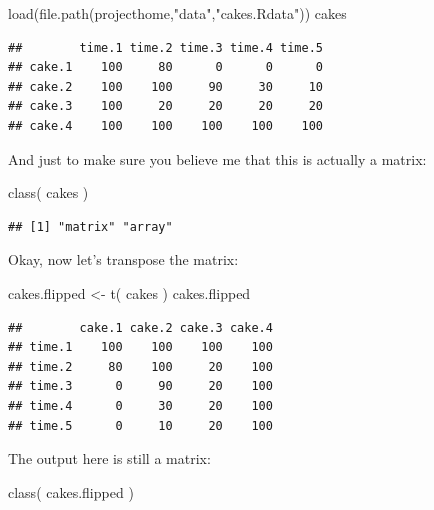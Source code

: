 \documentclass[
]{book}
\newenvironment{Shaded}{\begin{snugshade}}{\end{snugshade}}
\newcommand{\FunctionTok}[1]{\textcolor[rgb]{0.00,0.00,0.00}{#1}}
\newcommand{\NormalTok}[1]{#1}
\newcommand{\OtherTok}[1]{\textcolor[rgb]{0.56,0.35,0.01}{#1}}
\newcommand{\StringTok}[1]{\textcolor[rgb]{0.31,0.60,0.02}{#1}}
\begin{document}
\begin{Shaded}
\begin{Highlighting}[]
\FunctionTok{load}\NormalTok{(}\FunctionTok{file.path}\NormalTok{(projecthome,}\StringTok{"data"}\NormalTok{,}\StringTok{"cakes.Rdata"}\NormalTok{))}
\NormalTok{cakes}
\end{Highlighting}
\end{Shaded}

\begin{verbatim}
##        time.1 time.2 time.3 time.4 time.5
## cake.1    100     80      0      0      0
## cake.2    100    100     90     30     10
## cake.3    100     20     20     20     20
## cake.4    100    100    100    100    100
\end{verbatim}

And just to make sure you believe me that this is actually a matrix:

\begin{Shaded}
\begin{Highlighting}[]
\FunctionTok{class}\NormalTok{( cakes )}
\end{Highlighting}
\end{Shaded}

\begin{verbatim}
## [1] "matrix" "array"
\end{verbatim}

Okay, now let's transpose the matrix:

\begin{Shaded}
\begin{Highlighting}[]
\NormalTok{cakes.flipped }\OtherTok{\textless{}{-}} \FunctionTok{t}\NormalTok{( cakes )}
\NormalTok{cakes.flipped}
\end{Highlighting}
\end{Shaded}

\begin{verbatim}
##        cake.1 cake.2 cake.3 cake.4
## time.1    100    100    100    100
## time.2     80    100     20    100
## time.3      0     90     20    100
## time.4      0     30     20    100
## time.5      0     10     20    100
\end{verbatim}

The output here is still a matrix:

\begin{Shaded}
\begin{Highlighting}[]
\FunctionTok{class}\NormalTok{( cakes.flipped )}
\end{Highlighting}
\end{Shaded}
\end{document}
